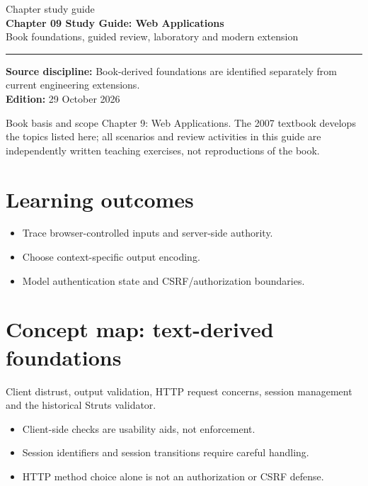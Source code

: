 \documentclass[10pt,letterpaper]{article}
\begin{document}
\hypersetup{pageanchor=false}%
\begin{titlepage}
\vspace*{1.0in}
{\color{bluegray}\Large Chapter study guide}\\[1.0em]
{\color{navy}\Huge\bfseries Chapter 09 Study Guide: Web Applications}\\[0.7em]
{\Large Book foundations, guided review, laboratory and modern extension}\\[2.0em]
\rule{\linewidth}{1.0pt}
\vfill
\textbf{Source discipline:} Book-derived foundations are identified separately from current engineering extensions.\\
\textbf{Edition:} 29 October 2026
\end{titlepage}\hypersetup{pageanchor=true}
\tableofcontents
\clearpage
\begin{focusbox}{Book basis and scope}
Chapter 9: Web Applications. The 2007 textbook develops the topics listed here; all scenarios and review activities in this guide are independently written teaching exercises, not reproductions of the book.\end{focusbox}
\section{Learning outcomes}
\begin{itemize}
\item Trace browser-controlled inputs and server-side authority.
\item Choose context-specific output encoding.
\item Model authentication state and CSRF/authorization boundaries.
\end{itemize}

\section{Concept map: text-derived foundations}
Client distrust, output validation, HTTP request concerns, session management and the historical Struts validator.
\begin{itemize}
\item Client-side checks are usability aids, not enforcement.
\item Session identifiers and session transitions require careful handling.
\item HTTP method choice alone is not an authorization or CSRF defense.
\end{itemize}
\end{document}
